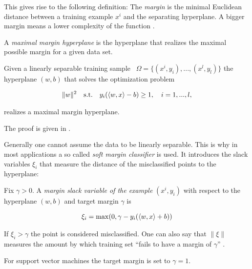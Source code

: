 This gives rise to the following definition:
The \emph{margin} is the minimal Euclidean distance between a training example \(x^i\) and the separating hyperplane.
A bigger margin means a lower complexity of the function \cite{Cristianini2000}. 

A \emph{maximal margin hyperplane} is the hyperplane that realizes the maximal possible margin for a given data set.

\begin{proposition}
Given a linearly separable training sample \ \(\Omega = \{(x^i,y_i),...,(x^l,y_l)\}\) the hyperplane \((w,b)\) that solves the optimization problem

\[\|w\|^2 \quad \text{s.t.} \quad y_i(\left\langle w,x\right\rangle-b)\geq 1, \quad i = 1,...,l, \]

realizes a maximal margin hyperplane.
\end{proposition}

The proof is given in \cite[chapter 6.1]{Cristianini2000}. 

Generally one cannot assume the data to be linearly separable. This is why in most applications a so called \emph{soft margin classifier} is used. It introduces the slack variables \(\xi_i\) that measure the distance of the misclassified points to the hyperplane:


Fix \(\gamma > 0\). A \emph{margin slack variable of the example} \((x^i,y_i)\) with respect to the hyperplane \((w,b)\) and target margin \(\gamma\) is 

\[\xi_i = \max(0, \gamma - y_i(\left\langle w,x\right\rangle+b))\] 

If \(\xi_i > \gamma\) the point is considered misclassified. 
One can also say that \(\|\xi\|\) measures the amount by which training set ``fails to have a margin of \(\gamma\)'' \cite[section 2.1.1]{Cristianini2000}.

For support vector machines the target margin is set to \(\gamma = 1\).


